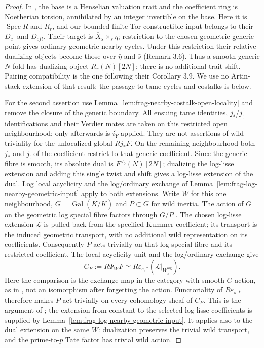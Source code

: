 \documentclass[11pt]{article}
\theoremstyle{definition}
\theoremstyle{remark}
\begin{document}
\begin{proof}
In \cite[\S3.1]{LuZhengNearbyDuality}, the base is a Henselian
valuation trait and the coefficient ring is Noetherian torsion,
annihilated by an integer invertible on the base.  Here it is
$\operatorname{Spec}R$ and $R_r$, and our bounded finite-Tor
constructible input belongs to their $D^-_c$ and $D_{cft}$.
Their target is $\overline X_s\bar\times_s\eta$; restriction to the
chosen geometric generic point gives ordinary geometric nearby
cycles.  Under this restriction their relative dualizing objects
become those over $\bar\eta$ and $\bar s$ (Remark 3.6).
Thus a smooth generic $N$-fold has dualizing object $R_r(N)[2N]$;
there is no additional trait shift.  Pairing compatibility is the
one following their Corollary 3.9.  We use no Artin-stack extension
of that result; the passage to tame cycles and costalks is below.

For the second assertion use Lemma~\ref{lem:frag-nearby-costalk-open-locality}
and remove the closure of the generic boundary.
All ensuing tame identities, $j_*$/$j_!$ identifications and their
Verdier mates are taken on this restricted open neighbourhood; only
afterwards is $i_Y^!$ applied.  They are not assertions of wild
triviality for the unlocalized global $Rj_*F$.
On the remaining neighbourhood both $j_*$ and $j_!$ of the coefficient
restrict to that generic coefficient.  Since the generic fibre is smooth,
its absolute dual is $F^{\vee_0}(N)[2N]$; dualizing the log-lisse extension
and adding this single twist and shift gives a log-lisse extension of
the dual.  Log local acyclicity and the log/ordinary exchange of
Lemma~\ref{lem:frag-log-nearby-geometric-input} apply to both extensions.
Write $W$ for this one neighbourhood, $G=\operatorname{Gal}(\bar K/K)$
and $P\subset G$ for wild inertia.  The action of $G$ on the geometric
log special fibre factors through $G/P$
\cite[\S8.1]{FujiwaraKatoNakayama}.  The chosen log-lisse extension
$\mathcal L$ is pulled back from the specified Kummer coefficient;
its transport is the induced geometric transport, with no additional
wild representation on its coefficients.  Consequently $P$ acts
trivially on that log special fibre and its restricted coefficient.
The local-acyclicity unit and the log/ordinary exchange give
\[
 C_F:=R\Psi_W F\simeq
 R\varepsilon_{s,*}(\mathcal L|_{W_{\bar s}^{\log}}).
\]
Here the comparison is the exchange map in the category with smooth
$G$-action, as in \cite[\S8.2, (8.2.3)]{FujiwaraKatoNakayama},
not an isomorphism after forgetting the action.  Functoriality of
$R\varepsilon_{s,*}$ therefore makes $P$ act trivially on every
cohomology sheaf of $C_F$.  This is the argument of
\cite[Corollary 8.4, (8.4.1)--(8.4.2)]{FujiwaraKatoNakayama};
the extension from constant to the selected log-lisse coefficients
is supplied by Lemma~\ref{lem:frag-log-nearby-geometric-input}.
It applies also to the dual extension on the same $W$: dualization
preserves the trivial wild transport, and the prime-to-$p$ Tate
factor has trivial wild action.


\end{proof}
\end{document}
